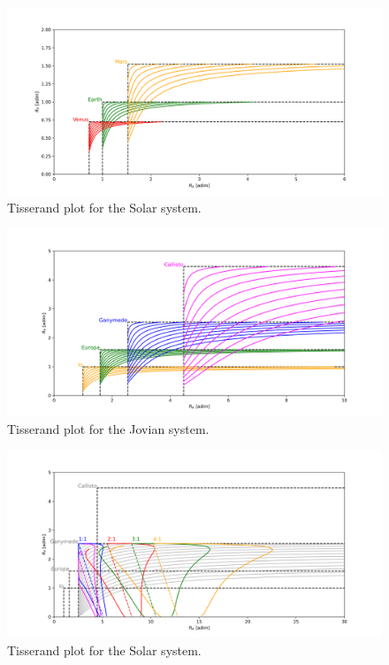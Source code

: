 \documentclass{article}
\begin{document}
\newpage
\begin{figure}[!htbp]
    \centering
    \includegraphics[width=\linewidth]{Figures/tisserand_solar.png}
    \caption{Tisserand plot for the Solar system.}
    \label{fig:tisserand_solar}
\end{figure}

\begin{figure}[!htbp]
    \centering
    \includegraphics[width=\linewidth]{Figures/tisserand_jovian.png}
    \caption{Tisserand plot for the Jovian system.}
    \label{fig:tisserand_jovian}
\end{figure}






\begin{figure}[!htbp]
    \centering
    \includegraphics[width=\linewidth]{Figures/tisserand_jovian_resonance.png}
    \caption{Tisserand plot for the Solar system.}
    \label{fig:tisserand_jovian_resonance}
\end{figure}
\end{document}
